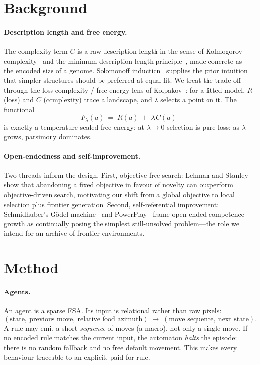 \documentclass[11pt]{article}
\begin{document}
\section{Background}
\paragraph{Description length and free energy.}
The complexity term $C$ is a raw description length in the sense of Kolmogorov
complexity~\cite{kolmogorov1965,live2008} and the minimum description length
principle~\cite{rissanen1978}, made concrete as the encoded size of a genome. Solomonoff
induction~\cite{solomonoff1964} supplies the prior intuition that simpler structures
should be preferred at equal fit. We treat the trade-off through the loss-complexity /
free-energy lens of Kolpakov~\cite{losscomplexity}: for a fitted model, $R$ (loss) and
$C$ (complexity) trace a landscape, and $\lambda$ selects a point on it. The functional
\[
  F_\lambda(a) \;=\; R(a) \;+\; \lambda\, C(a)
\]
is exactly a temperature-scaled free energy: at $\lambda \to 0$ selection is pure loss;
as $\lambda$ grows, parsimony dominates.

\paragraph{Open-endedness and self-improvement.}
Two threads inform the design. First, objective-free search: Lehman and
Stanley~\cite{lehman2011novelty} show that abandoning a fixed objective in favour of
novelty can outperform objective-driven search, motivating our shift from a global
objective to local selection plus frontier generation. Second, self-referential
improvement: Schmidhuber's G\"odel machine~\cite{schmidhuber2007godel} and
PowerPlay~\cite{schmidhuber2013powerplay} frame open-ended competence growth as
continually posing the simplest still-unsolved problem---the role we intend for an
archive of frontier environments.

\section{Method}
\paragraph{Agents.}
An agent is a sparse FSA. Its input is relational rather than raw pixels:
\[
  (\text{state},\ \text{previous\_move},\ \text{relative\_food\_azimuth})
  \;\longrightarrow\; (\text{move\_sequence},\ \text{next\_state}).
\]
A rule may emit a short \emph{sequence} of moves (a macro), not only a single move. If
no encoded rule matches the current input, the automaton \emph{halts} the episode: there
is no random fallback and no free default movement. This makes every behaviour traceable
to an explicit, paid-for rule.
\end{document}
